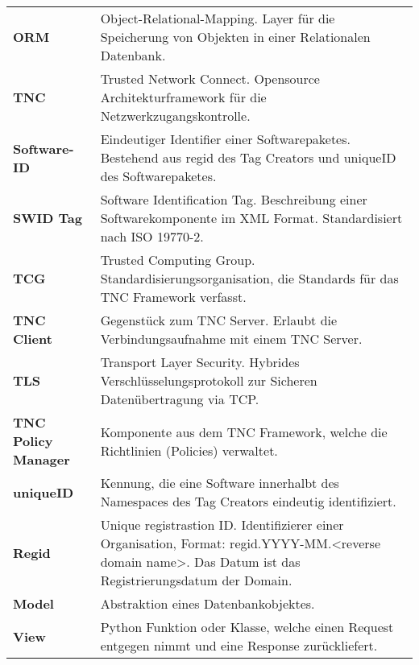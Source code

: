 {\begin{longtable}{ll}
\textbf{ORM} & Object-Relational-Mapping. Layer für die Speicherung von Objekten in einer Relationalen Datenbank.\\

\textbf{TNC} & Trusted Network Connect. Opensource Architekturframework für die Netzwerkzugangskontrolle.\\

\textbf{Software-ID} & Eindeutiger Identifier einer Softwarepaketes. Bestehend aus regid des Tag Creators und uniqueID des Softwarepaketes.\\

\textbf{SWID Tag} & Software Identification Tag. Beschreibung einer Softwarekomponente im XML Format. Standardisiert nach ISO 19770-2.\\

\textbf{TCG} & Trusted Computing Group. Standardisierungsorganisation, die Standards für das TNC Framework verfasst.\\
 
\textbf{TNC Client} & Gegenstück zum TNC Server. Erlaubt die Verbindungsaufnahme mit einem TNC Server.\\

\textbf{TLS} & Transport Layer Security. Hybrides Verschlüsselungsprotokoll zur Sicheren Datenübertragung via TCP.\\

\textbf{TNC Policy Manager} & Komponente aus dem TNC Framework, welche die Richtlinien (Policies) verwaltet.\\

\textbf{uniqueID} & Kennung, die eine Software innerhalbt des Namespaces des Tag Creators eindeutig identifiziert.\\

\textbf{Regid} & Unique registrastion ID. Identifizierer einer Organisation, Format: regid.YYYY-MM.<reverse domain name>. Das Datum ist das Registrierungsdatum der Domain.\\

\textbf{Model} & Abstraktion eines Datenbankobjektes.\\

\textbf{View} & Python Funktion oder Klasse, welche einen Request entgegen nimmt und eine Response zurückliefert.\\

\end{longtable}
}
